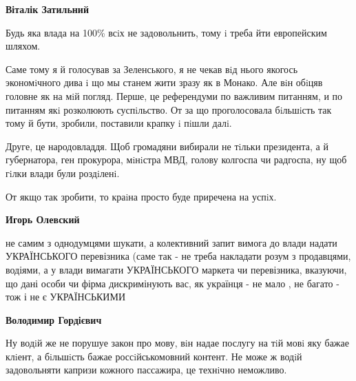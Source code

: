 \begin{itemize}
\begin{itemize}
\begin{itemize}
\textbf{Віталік Затильний}

Будь яка влада на 100\% всiх не задовольнить, тому i треба йти европейским
шляхом.

Саме тому я й голосував за Зеленського, я не чекав вiд нього якогось
экономiчного дива i що мы станем жити зразу як в Монако. Але вiн обiцяв головне
як на мiй погляд. Перше, це референдуми по важливим питанням, и по питанням якi
розколюють суспiльство. От за що проголосовала бiльшiсть так тому й бути,
зробили, поставили крапку i пiшли далi.

Друге, це народовладдя. Щоб громадяни вибирали не тiльки президента, а й
губернатора, ген прокурора, мiнiстра МВД, голову колгоспа чи радгоспа, ну щоб
гiлки влади були роздiленi.

От якщо так зробити, то краiна просто буде приречена на успiх.

 
\textbf{Игорь Олевский} 

не самим з однодумцями шукати, а колективний запит вимога до влади надати
УКРАЇНСЬКОГО перевізника (саме так - не треба накладати розум з продавцями,
водіями, а у влади вимагати УКРАЇНСЬКОГО маркета чи перевізника, вказуючи, що
дані особи чи фірма дискримінують вас, як українця - не мало , не багато - тож
і не є УКРАЇНСЬКИМИ

 
\textbf{Володимир Гордієвич}

Ну водiй же не порушуе закон про мову, вiн надае послугу на тiй мовi яку бажае
клiент, а бiльшiсть бажае россiйськомовний контент. Не може ж водiй
задовольняти капризи кожного пассажира, це технiчно неможливо.
\end{itemize}

 

\end{itemize}
\end{itemize}
